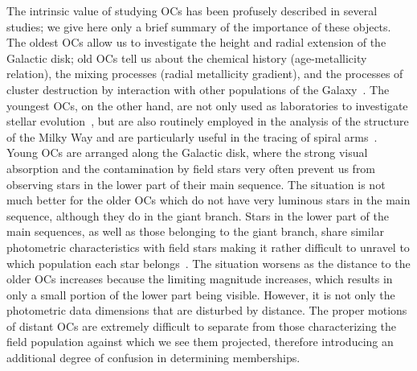 \documentclass{aa}
\begin{document}
 The intrinsic value of studying OCs has been profusely described in several
 studies; we  give here only a brief summary of the importance
 of these objects. The oldest OCs
 allow us to investigate the height and radial extension of the Galactic disk;
 old OCs tell us about the chemical history (age-metallicity relation), the
 mixing processes (radial metallicity gradient), and the processes of cluster
 destruction by interaction with other populations of the
 Galaxy~\citep{Friel1995,Tosi_2004,Lamers_2005}.
 The youngest OCs, on the other hand, are not only used as laboratories to
 investigate stellar evolution~\citep[they allow  the boundary
 conditions necessary to create new generations of stars to be studied in detail;][]{Lada2003}, but are
 also routinely employed in the analysis of the structure of the  Milky Way \citep{Loktin_1992,Moitinho_2006,Vazquez2008,Moitinho_2010}
 and are  particularly useful in the tracing of spiral
 arms~\citep{carraro_2013,Molina_2018}.
 Young OCs are arranged along the Galactic disk, where the strong visual
 absorption and the contamination by field stars very often prevent us from observing
 stars in the lower part of their main sequence.
 The situation is not much better for the older OCs which do not
 have very luminous stars in the main sequence, although they do in the giant
 branch. Stars in the lower part of the main sequences, as well as those
 belonging to the giant branch, share similar photometric characteristics with
 field stars making it rather difficult to unravel to which population each star
 belongs~\citep{Hayes_2015}.
 The situation worsens as the distance to the older OCs increases because the
 limiting magnitude increases, which results in only a small portion of
 the lower part being visible. However,  it is not only the photometric
 data dimensions that are disturbed by distance. The proper
 motions of distant OCs are
 extremely difficult to separate from those characterizing the field
 population against which we see them projected, therefore introducing an
 additional degree of confusion in determining memberships.
\end{document}
